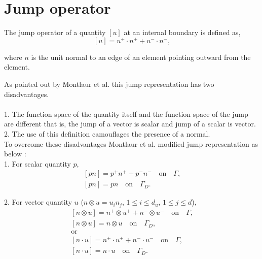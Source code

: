 \documentclass[a4paper,twoside,openright]{book}
\begin{document}
\section{Jump operator} \label{jump_operator_ch3}

The jump operator of a quantity $[u]$ at an internal boundary is defined as,
\begin{equation}\label{jump operator}
[u]=u^+ \cdot n^+ + u^- \cdot n^- \textrm{,}
\end{equation}

where $n$ is the unit normal to an edge of an element pointing outward from the element.

As pointed out by Montlaur et al. \cite{Montlaur2} this jump representation has two disadvantages.\\
{}\\
1. The function space of the quantity itself and the function space of the jump are different that is, the jump of a vector is scalar and jump of a scalar is vector.\\
2. The use of this definition camouflages the presence of a normal.\\

To overcome these disadvantages Montlaur et al. \cite{Montlaur2} modified jump representation as below :\\

1.  For scalar quantity $p$,
\begin{equation}
\begin{split}
[pn] = p^+ n^+ + p^- n^- \quad \textrm{on} \quad \Gamma \textrm{,}\\
[pn] = p n \quad \textrm{on} \quad \Gamma_D \textrm{.}
\end{split}
\end{equation}

2. For vector quantity $u$ ($n \otimes u = u_i n_j$, $1 \leq i \leq d_u$, $1 \leq j \leq d$),
\begin{equation}
\begin{split}
[n \otimes u] = n^+ \otimes u^+ + n^- \otimes u^- \quad \textrm{on} \quad \Gamma \textrm{,}\\
[n \otimes u] = n \otimes u \quad \textrm{on} \quad \Gamma_D \textrm{,}\\
 \textrm{or} \\
[n \cdot u] = n^+ \cdot u^+ + n^- \cdot u^- \quad \textrm{on} \quad \Gamma \textrm{,}\\
[n \cdot u] = n \cdot u \quad \textrm{on} \quad \Gamma_D \textrm{.}\\
\end{split}
\end{equation}
\end{document}
